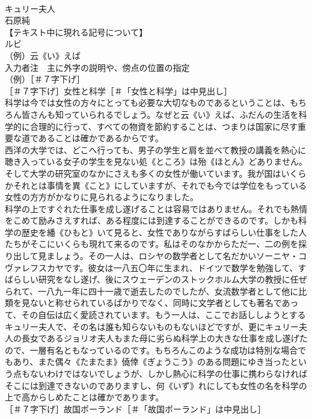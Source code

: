 \documentclass[8pt]{extreport}
\begin{document}
\begin{CJK}{UTF8}{min}
\\	キュリー夫人
\\	石原純
\\	【テキスト中に現れる記号について】
\\	ルビ
\\	（例）云《い》えば
\\	入力者注　主に外字の説明や、傍点の位置の指定
\\	（例）［＃７字下げ］
\\	［＃７字下げ］女性と科学［＃「女性と科学」は中見出し］
\\	科学は今では女性の方々にとっても必要な大切なものであるということは、もちろん皆さんも知っていられるでしょう。なぜと云《い》えば、ふだんの生活を科学的に合理的に行って、すべての物資を節約することは、つまりは国家に尽す重要な道であることは確かであるからです。
\\	西洋の大学では、どこへ行っても、男子の学生と肩を並べて教授の講義を熱心に聴き入っている女子の学生を見ない処《ところ》は殆《ほとん》どありません。そして大学の研究室のなかにさえも多くの女性が働いています。我が国はいくらかそれとは事情を異《こと》にしていますが、それでも今では学位をもっている女性の方方がかなりに見られるようになりました。
\\	科学の上ですぐれた仕事を成し遂げることは容易ではありません。それでも熱情をこめて励みさえすれば、ある程度には到達することができるのです。しかも科学の歴史を繙《ひもと》いて見ると、女性でありながらすばらしい仕事をした人たちがそこにいくらも現れて来るのです。私はそのなかからただ一、二の例を採り出して見ましょう。その一人は、ロシヤの数学者として名だかいソーニヤ・コヴァレフスカヤです。彼女は一八五〇年に生まれ、ドイツで数学を勉強して、すばらしい研究をなし遂げ、後にスウェーデンのストックホルム大学の教授に任ぜられて、一八九一年に四十一歳で逝去したのでしたが、女流数学者として他に比類を見ないと称せられているばかりでなく、同時に文学者としても著名であって、その自伝は広く愛読されています。もう一人は、ここでお話ししようとするキュリー夫人で、その名は誰も知らないものもないほどですが、更にキュリー夫人の長女であるジョリオ夫人もまた母に劣らぬ科学上の大きな仕事を成し遂げたので、一層有名ともなっているのです。もちろんこのような成功は特別な場合でもあり、また偶々《たまたま》僥倖《ぎょうこう》のある問題にゆき当ったという点もないわけではないでしょうが、しかし熱心に科学の仕事に携わらなければそこには到達できないのでありますし、何《いず》れにしても女性の名を科学の上で高からしめたことは確かであります。
\\	［＃７字下げ］故国ポーランド［＃「故国ポーランド」は中見出し］

\end{CJK}
\end{document}

